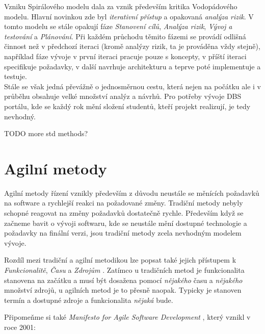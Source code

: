 Vzniku Spirálového modelu dala za vznik především kritika Vodopádového modelu. Hlavní novinkou zde byl \emph{iterativní přístup} a opakovaná \emph{analýza rizik}. V tomto modelu se stále opakují fáze \emph{Stanovení cílů}, \emph{Analýza rizik}, \emph{Vývoj a testování} a \emph{Plánování}. Při každém průchodu těmito fázemi se provádí odlišná činnost než v předchozí iteraci (kromě analýzy rizik, ta je prováděna vždy stejně), například fáze vývoje v první iteraci pracuje pouze s koncepty, v příští iteraci specifikuje požadavky, v další navrhuje architekturu a teprve poté implementuje a testuje.\\
Stále se však jedná převážně o jednosměrnou cestu, která nejen na počátku ale i v průběhu obsahuje velké množství analýz a návrhů. Pro potřeby vývoje DBS portálu, kde se každý rok mění složení studentů, kteří projekt realizují, je tedy nevhodný.

TODO more std methods?



\section{Agilní metody} \label{methods:agile}

Agilní metody řízení vznikly především z důvodu neustále se měnících požadavků na software a rychlejší reakci na požadované změny. Tradiční metody nebyly schopné reagovat na změny požadavků dostatečně rychle. Především když se začneme bavit o vývoji softwaru, kde se neustále mění dostupné technologie a požadavky na finální verzi, jsou tradiční metody zcela nevhodným modelem vývoje.

Rozdíl mezi tradiční a agilní metodikou lze popsat také jejich přístupem k \emph{Funkcionalitě}, \emph{Času} a \emph{Zdrojům} \cite{kadlec}. Zatímco u tradičních metod je funkcionalita stanovena na začátku a musí být dosažena pomocí \emph{nějakého} času a \emph{nějakého} množství zdrojů, u agilních metod je to přesně naopak. Typicky je stanoven termín a dostupné zdroje a funkcionalita \emph{nějaká} bude.

Připomeňme si také \emph{Manifesto for Agile Software Development} \cite{manifesto}, který vznikl v roce 2001:

